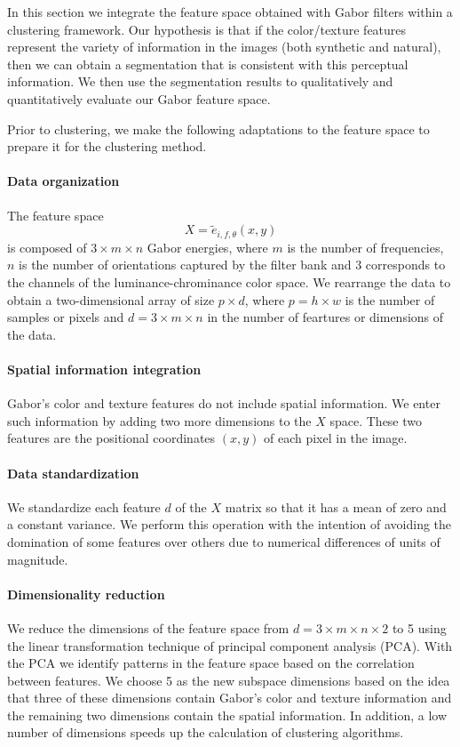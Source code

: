 In this section we integrate the feature space obtained with Gabor filters within a clustering framework. Our hypothesis is that if the color/texture features represent the variety of information in the images (both synthetic and natural), then we can obtain a segmentation that is consistent with this perceptual information. We then use the segmentation results to qualitatively and quantitatively evaluate our Gabor feature space.

Prior to clustering, we make the following adaptations to the feature space to prepare it for the clustering method.

\paragraph{Data organization}
The feature space 
\begin{equation}\label{eq:feature_space}
	X = \widetilde{e}_{i, f, \theta}(x,y)
\end{equation}
is composed of $3 \times m \times n$ Gabor energies, where $m$ is the number of frequencies, $n$ is the number of orientations captured by the filter bank and $3$ corresponds to the channels of the luminance-chrominance color space. We rearrange the data to obtain a two-dimensional array of size $p \times d$, where $p= h\times w$  is the number of samples or pixels and $d =3 \times m \times n$ in the number of feartures or dimensions of the data.

\paragraph{Spatial information integration}
Gabor's color and texture features do not include spatial information. We enter such information by adding two more dimensions to the $X$ space. These two features are the positional coordinates $(x, y)$ of each pixel in the image. 

\paragraph{Data standardization}
We standardize each feature $d$ of the $X$ matrix so that it has a mean of zero and a constant variance. We perform this operation with the intention of avoiding the domination of some features over others due to numerical differences of units of magnitude. 

\paragraph{Dimensionality reduction}
We reduce the dimensions of the feature space from  $d =3 \times m \times n \times 2 $ to 5 using the linear transformation technique of principal component analysis (PCA). With the PCA we identify patterns in the feature space based on the correlation between features. We choose 5 as the new subspace dimensions based on the idea that three of these dimensions contain Gabor's color and texture information and the remaining two dimensions contain the spatial information. In addition, a low number of dimensions speeds up the calculation of clustering algorithms.

